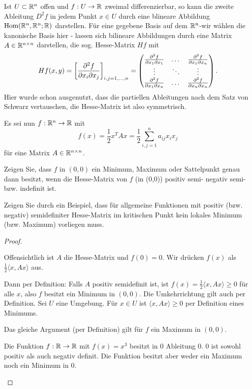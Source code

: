 \begin{Problem}
	Ist $U\subset \mathbb{R}^n$ offen und $f:U\to \mathbb{R}$ zweimal differenzierbar, so kann die zweite Ableitung $D^2f$ in jedem Punkt $x\in U$ durch eine blineare Abbildung $\text{Hom}(\mathbb{R}^n,\mathbb{R}^n;\mathbb{R})$ darstellen. F\"{u}r eine gegebene Basis auf dem $\mathbb{R}^n$-wir wählen die kanonische Basis hier - lassen sich bilineare Abbildungen durch eine Matrix $A\in \mathbb{R}^{n\times n}$ darstellen, die sog. Hesse-Matrix $Hf$ mit
	\[
		Hf(x,y)=\left[ \pdv[2]{f}{x_i}{x_j}(x) \right]_{i,j=1,\dots, n}=\begin{pmatrix} \pdv[2]{f}{x_1}{x_1} & \dots & \pdv[2]{f}{x_1}{x_n} \\ \vdots & \ddots & \vdots \\ \pdv[2]{f}{x_1}{x_n} & \dots & \pdv[2]{f}{x_n}{x_n}\end{pmatrix} 
	.\] 
Hier wurde schon ausgenutzt, dass die partiellen Ableitungen nach dem Satz von Schwarz vertauschen, die Hesse-Matrix ist also symmetrisch.

Es sei nun $f:\mathbb{R}^n\to \mathbb{R}$ mit
\[
	f(x)=\frac{1}{2}x^T Ax=\frac{1}{2}\sum_{i,j=1}^n a_{ij}x_i x_j
\]
f\"{u}r eine Matrix $A\in \mathbb{R}^{n\times n}$.
\begin{parts}
	\item Zeigen Sie, dass $f$ in $(0,0)$ ein Minimum, Maximum oder Sattelpunkt genau dann besitzt, wenn die Hesse-Matrix von $f$ (in (0,0)) positiv semi- negativ semi- bzw. indefinit ist. 
	\item Zeigen Sie durch ein Beispiel, dass für allgemeine Funktionen mit positiv (bzw. negativ) semidefiniter Hesse-Matrix im kritischen Punkt kein lokales Minimum (bzw. Maximum) vorliegen muss.  
\end{parts}
\end{Problem}
\begin{proof}
	\begin{parts}
	\item Offensichtlich ist $A$ die Hesse-Matrix und $f(0)=0$. Wir drücken $f(x)$ als $\frac{1}{2}\langle x, Ax\rangle$ aus.

	Dann per Definition: Falls $A$ positiv semidefinit ist, ist $f(x)=\frac{1}{2}\langle x, Ax\rangle\ge 0$ f\"{u}r alle $x$, also $f$ besitzt ein Minimum in $(0,0)$. Die Umkehrrichtung gilt auch per Definition. Sei $U$ eine Umgebung. F\"{u}r $x\in U$ ist $\langle x, Ax\rangle \ge 0$ per Definition eines Minimums. 

	Das gleiche Argument (per Definition) gilt f\"{u}r $f$ ein Maximum in $(0,0)$.
\item Die Funktion $f:\mathbb{R}\to\mathbb{R}$ mit $f(x)=x^3$ besitzt in $0$ Ableitung $0$. $0$ ist sowohl positiv als auch negativ definit. Die Funktion besitzt aber weder ein Maximum noch ein Minimum in $0$.
\end{parts}
\end{proof}
